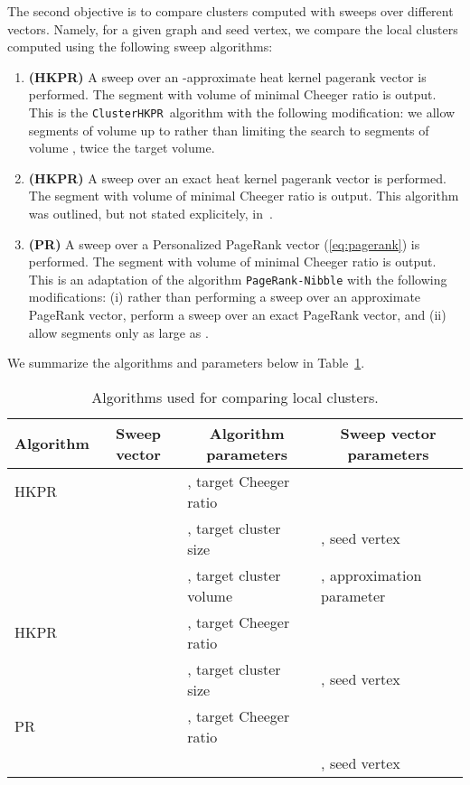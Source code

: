 \documentclass[runningheads,a4paper]{llncs}
\newcommand{\partitionalg}{\texttt{ClusterHKPR}}
\begin{document}
The second objective is to compare clusters computed with sweeps over different
vectors.  Namely, for a given graph and seed vertex, we compare the local
clusters computed using the following sweep algorithms:

\begin{enumerate}
\item \textbf{(HKPR)} A sweep over an -approximate heat
kernel pagerank vector is performed.  The segment  with volume  of minimal Cheeger ratio is output.  This is the
\partitionalg~algorithm with the following modification: we allow segments of
volume up to  rather than limiting the search to segments of volume
, twice the target volume.\label{pt:epshkpr}
\item \textbf{(HKPR)} A sweep over an exact heat kernel pagerank vector is
performed.  The segment  with volume  of minimal Cheeger
ratio is output.  This algorithm was outlined, but not stated explicitely,
in~\cite{chung:partitionhkpr:im09}.
\item \textbf{(PR)} A sweep over a Personalized PageRank vector
(\ref{eq:pagerank}) is performed.  The segment  with volume  of minimal Cheeger ratio is output.  This is an adaptation of the
algorithm \texttt{PageRank-Nibble}\cite{acl:prgraphpartition:focs06} with the
following modifications: (i) rather than performing a sweep over an approximate
PageRank vector, perform a sweep over an exact PageRank vector, and (ii) allow
segments only as large as .
\end{enumerate}

We summarize the algorithms and parameters below in
Table~\ref{table:clusteralgs}.

\begin{table}
\centering
\begin{tabular}{|l|c|l|l|}
\hline
\multicolumn{1}{|c|}{Algorithm} & Sweep vector &
\multicolumn{1}{|c|}{Algorithm parameters} & \multicolumn{1}{|c|}{Sweep vector
parameters}\\
\hline\hline
HKPR &  & , target Cheeger ratio & \\
& & , target cluster size & , seed vertex\\
& & , target cluster volume & , approximation parameter\\\hline
HKPR &  & , target Cheeger ratio & \\
& & , target cluster size & , seed vertex\\\hline
PR &  & , target Cheeger ratio & \\
& & & , seed vertex\\\hline
\end{tabular}
\caption{Algorithms used for comparing local clusters.}
\label{table:clusteralgs}
\end{table}
\end{document}
